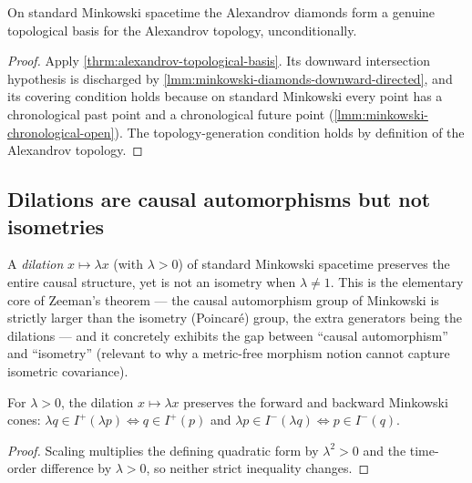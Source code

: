 \begin{theorem}
    \label{thrm:minkowski-alexandrov-basis}
    \leanok
    On standard Minkowski spacetime the Alexandrov diamonds form a genuine topological basis for the Alexandrov topology, unconditionally.
\end{theorem}
\begin{proof}
    \leanok
    Apply \ref{thrm:alexandrov-topological-basis}. Its downward intersection hypothesis is discharged by \ref{lmm:minkowski-diamonds-downward-directed}, and its covering condition holds because on standard Minkowski every point has a chronological past point and a chronological future point (\ref{lmm:minkowski-chronological-open}). The topology-generation condition holds by definition of the Alexandrov topology.
\end{proof}

\medskip

\subsection{Dilations are causal automorphisms but not isometries}

A \emph{dilation} $x \mapsto \lambda x$ (with $\lambda > 0$) of standard Minkowski spacetime preserves the entire causal structure, yet is not an isometry when $\lambda \neq 1$. This is the elementary core of Zeeman's theorem --- the causal automorphism group of Minkowski is strictly larger than the isometry (Poincar\'e) group, the extra generators being the dilations --- and it concretely exhibits the gap between ``causal automorphism'' and ``isometry'' (relevant to why a metric-free morphism notion cannot capture isometric covariance).

\begin{lemma}
    \label{lmm:minkowski-dilation-cone}
    \leanok
    For $\lambda > 0$, the dilation $x \mapsto \lambda x$ preserves the forward and backward Minkowski cones: $\lambda q \in I^+(\lambda p) \iff q \in I^+(p)$ and $\lambda p \in I^-(\lambda q) \iff p \in I^-(q)$.
\end{lemma}
\begin{proof}
    \leanok
    Scaling multiplies the defining quadratic form by $\lambda^2 > 0$ and the time-order difference by $\lambda > 0$, so neither strict inequality changes.
\end{proof}


